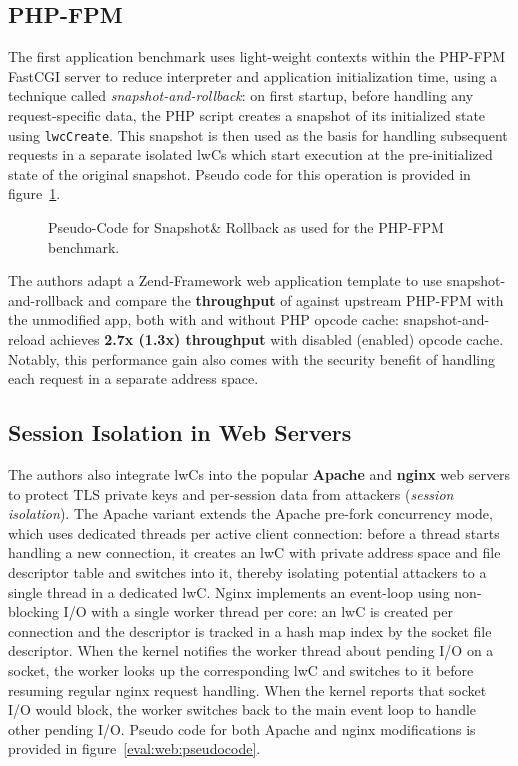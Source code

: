 \documentclass[10pt,twocolumn,a4paper]{article}
\begin{document}
\subsection{PHP-FPM}
The first application benchmark uses light-weight contexts within the PHP-FPM FastCGI server to reduce interpreter and application initialization time, using a technique called \textit{snapshot-and-rollback}:
on first startup, before handling any request-specific data, the PHP script creates a snapshot of its initialized state using \lstinline{lwcCreate}.
This snapshot is then used as the basis for handling subsequent requests in a separate isolated lwCs which start execution at the pre-initialized state of the original snapshot.
Pseudo code for this operation is provided in figure~\ref{eval:phpfpm:pseudocode}.
\cite{lwcpaper}

\begin{figure}
  \centering
  \missingfigure[figheight=6.5cm]{}
  \caption{Pseudo-Code for Snapshot\& Rollback as used for the PHP-FPM benchmark.}
  \label{eval:phpfpm:pseudocode}
\end{figure}

The authors adapt a Zend-Framework web application template to use snapshot-and-rollback and compare the \textbf{throughput} of against upstream PHP-FPM with the unmodified app, both with and without PHP opcode cache:
snapshot-and-reload achieves \textbf{2.7x (1.3x) throughput} with disabled (enabled) opcode cache.
Notably, this performance gain also comes with the security benefit of handling each request in a separate address space.\cite{zend,lwcpaper}

\subsection{Session Isolation in Web Servers}\label{eval:web}
The authors also integrate lwCs into the popular \textbf{Apache} and \textbf{nginx} web servers to protect TLS private keys and per-session data from attackers (\textit{session isolation}).
The Apache variant extends the Apache pre-fork concurrency mode, which uses dedicated threads per active client connection:
before a thread starts handling a new connection, it creates an lwC with private address space and file descriptor table and switches into it, thereby isolating potential attackers to a single thread in a dedicated lwC.
Nginx implements an event-loop using non-blocking I/O with a single worker thread per core:
an lwC is created per connection and the descriptor is tracked in a hash map index by the socket file descriptor.
When the kernel notifies the worker thread about pending I/O on a socket, the worker looks up the corresponding lwC and switches to it before resuming regular nginx request handling.
When the kernel reports that socket I/O would block, the worker switches back to the main event loop to handle other pending I/O.
Pseudo code for both Apache and nginx modifications is provided in figure~\ref{eval:web:pseudocode}.
\cite{lwcpaper}
\end{document}
